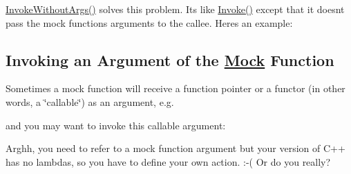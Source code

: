{\ttfamily \mbox{\hyperlink{namespacetesting_aabc08d610483908c8346f2e3318ad449}{Invoke\+Without\+Args()}}} solves this problem. It\textquotesingle{}s like {\ttfamily \mbox{\hyperlink{namespacetesting_af5cacf4475557b5a3e37af3836564235}{Invoke()}}} except that it doesn\textquotesingle{}t pass the mock function\textquotesingle{}s arguments to the callee. Here\textquotesingle{}s an example\+:


\begin{DoxyCode}{0}
\DoxyCodeLine{}
\DoxyCodeLine{\};}
\DoxyCodeLine{}
\DoxyCodeLine{}
\DoxyCodeLine{}
\end{DoxyCode}


\subsection*{Invoking an Argument of the \mbox{\hyperlink{class_mock}{Mock}} Function}

Sometimes a mock function will receive a function pointer or a functor (in other words, a \char`\"{}callable\char`\"{}) as an argument, e.\+g.


\begin{DoxyCode}{0}
\DoxyCodeLine{\};}
\end{DoxyCode}


and you may want to invoke this callable argument\+:


\begin{DoxyCode}{0}
\end{DoxyCode}


Arghh, you need to refer to a mock function argument but your version of C++ has no lambdas, so you have to define your own action. \+:-\/( Or do you really?

